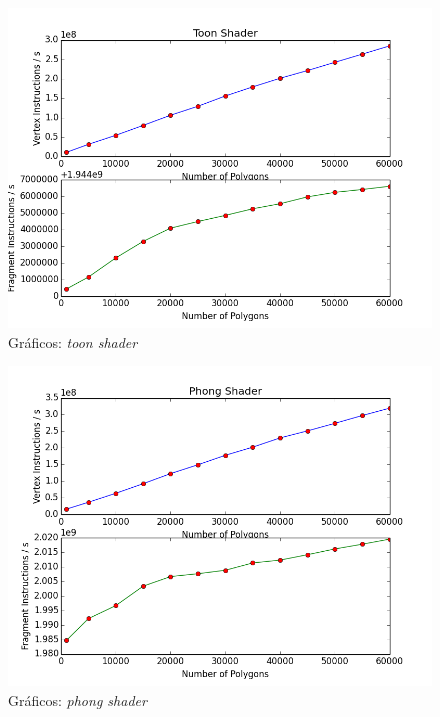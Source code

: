 	\begin{figure}[h]
	\centering
		\includegraphics[keepaspectratio=true,scale=0.6]{figuras/toonplot.png}
	\caption{Gráficos: \textit{toon shader}}
	\label{plottoon}
	\end{figure}	

	\begin{figure}[h]
	\centering
		\includegraphics[keepaspectratio=true,scale=0.6]{figuras/phongplot.png}
	\caption{Gráficos: \textit{phong shader}}
	\label{plotphong}
	\end{figure}

